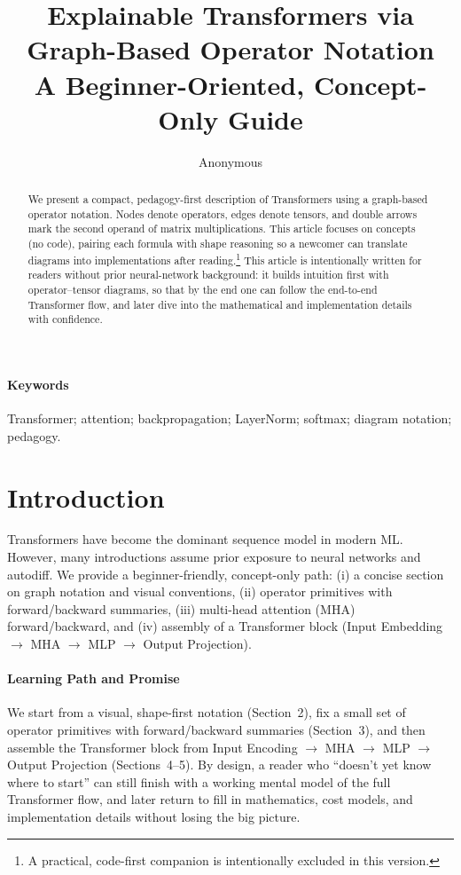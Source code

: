 \documentclass[10pt]{article}
\title{Explainable Transformers via Graph-Based Operator Notation\\\large A Beginner-Oriented, Concept-Only Guide}
\author{Anonymous}
\date{} %
\begin{document}
\maketitle

\begin{abstract}
We present a compact, pedagogy-first description of Transformers using a graph-based operator notation. Nodes denote operators, edges denote tensors, and double arrows mark the second operand of matrix multiplications. This article focuses on concepts (no code), pairing each formula with shape reasoning so a newcomer can translate diagrams into implementations after reading.\footnote{A practical, code-first companion is intentionally excluded in this version.}
This article is intentionally written for readers without prior neural-network background: it builds intuition first with operator–tensor diagrams, so that by the end one can follow the end-to-end Transformer flow, and later dive into the mathematical and implementation details with confidence.
\end{abstract}

\paragraph{Keywords} Transformer; attention; backpropagation; LayerNorm; softmax; diagram notation; pedagogy.

\section{Introduction}
Transformers have become the dominant sequence model in modern ML. However, many introductions assume prior exposure to neural networks and autodiff. We provide a beginner-friendly, concept-only path: (i) a concise section on graph notation and visual conventions, (ii) operator primitives with forward/backward summaries, (iii) multi-head attention (MHA) forward/backward, and (iv) assembly of a Transformer block (Input Embedding $\rightarrow$ MHA $\rightarrow$ MLP $\rightarrow$ Output Projection).
\paragraph{Learning Path and Promise}
We start from a visual, shape-first notation (Section~2), fix a small set of operator primitives with forward/backward summaries (Section~3), and then assemble the Transformer block from Input Encoding $\rightarrow$ MHA $\rightarrow$ MLP $\rightarrow$ Output Projection (Sections~4–5).
By design, a reader who “doesn’t yet know where to start” can still finish with a working mental model of the full Transformer flow, and later return to fill in mathematics, cost models, and implementation details without losing the big picture.
\end{document}
